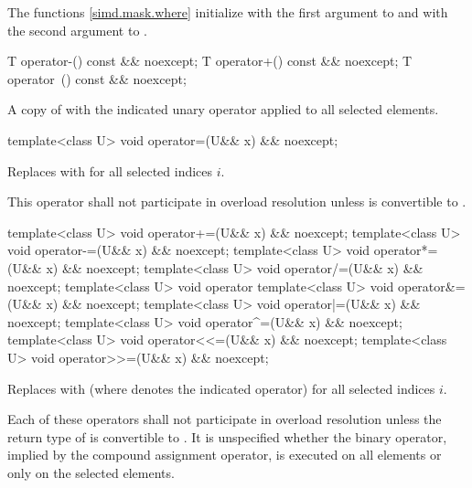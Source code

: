 \pnum
\begin{note}
  The  functions \ref{simd.mask.where} initialize  with the first argument to  and  with the second argument to .
\end{note}

\begin{itemdecl}
T operator-() const && noexcept;
T operator+() const && noexcept;
T operator~() const && noexcept;
\end{itemdecl}

\begin{itemdescr}
  \pnum\returns
  A copy of  with the indicated unary operator applied to all selected elements.
\end{itemdescr}

\begin{itemdecl}
template<class U> void operator=(U&& x) && noexcept;
\end{itemdecl}

\begin{itemdescr}
  \pnum\effects
  Replaces  with  for all selected indices $i$.

  \pnum\remarks
  This operator shall not participate in overload resolution unless  is convertible to .
\end{itemdescr}

\begin{itemdecl}
template<class U> void operator+=(U&& x) && noexcept;
template<class U> void operator-=(U&& x) && noexcept;
template<class U> void operator*=(U&& x) && noexcept;
template<class U> void operator/=(U&& x) && noexcept;
template<class U> void operator%
template<class U> void operator&=(U&& x) && noexcept;
template<class U> void operator|=(U&& x) && noexcept;
template<class U> void operator^=(U&& x) && noexcept;
template<class U> void operator<<=(U&& x) && noexcept;
template<class U> void operator>>=(U&& x) && noexcept;
\end{itemdecl}

\begin{itemdescr}
  \pnum\effects
  Replaces  with  (where  denotes the indicated operator) for all selected indices $i$.

  \pnum\remarks
  Each of these operators shall not participate in overload resolution unless the return type of  is convertible to . It is unspecified whether the binary operator, implied by the compound assignment operator, is executed on all elements or only on the selected elements.
\end{itemdescr}

